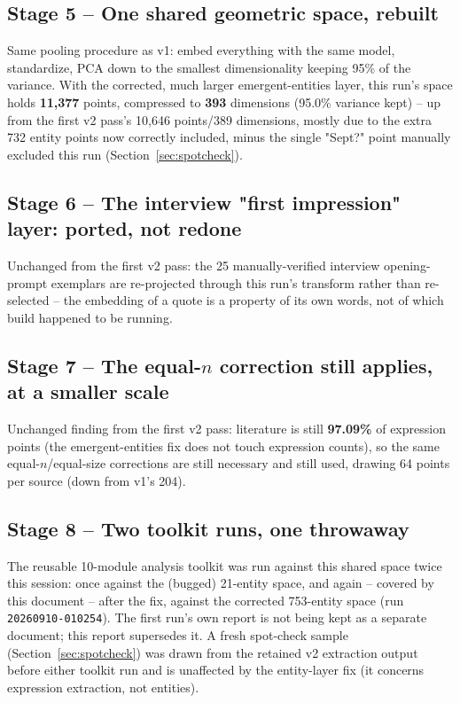 \documentclass[11pt,a4paper]{article}
\begin{document}
\subsection{Stage 5 -- One shared geometric space, rebuilt}
Same pooling procedure as v1: embed everything with the same model,
standardize, PCA down to the smallest dimensionality keeping 95\% of the
variance. With the corrected, much larger emergent-entities layer, this
run's space holds \textbf{11,377} points, compressed to \textbf{393}
dimensions (95.0\% variance kept) -- up from the first v2 pass's 10,646
points/389 dimensions, mostly due to the extra 732 entity points now
correctly included, minus the single "Sept?" point manually excluded
this run (Section~\ref{sec:spotcheck}).

\subsection{Stage 6 -- The interview "first impression" layer: ported, not redone}
Unchanged from the first v2 pass: the 25 manually-verified interview
opening-prompt exemplars are re-projected through this run's transform
rather than re-selected -- the embedding of a quote is a property of its
own words, not of which build happened to be running.

\subsection{Stage 7 -- The equal-$n$ correction still applies, at a smaller scale}
Unchanged finding from the first v2 pass: literature is still
\textbf{97.09\%} of expression points (the emergent-entities fix does
not touch expression counts), so the same equal-$n$/equal-size
corrections are still necessary and still used, drawing 64 points per
source (down from v1's 204).

\subsection{Stage 8 -- Two toolkit runs, one throwaway}
The reusable 10-module analysis toolkit was run against this shared
space twice this session: once against the (bugged) 21-entity space,
and again -- covered by this document -- after the fix, against the
corrected 753-entity space (run \texttt{20260910-010254}). The first
run's own report is not being kept as a separate document; this report
supersedes it. A fresh spot-check sample (Section~\ref{sec:spotcheck})
was drawn from the retained v2 extraction output before either toolkit
run and is unaffected by the entity-layer fix (it concerns expression
extraction, not entities).
\end{document}
